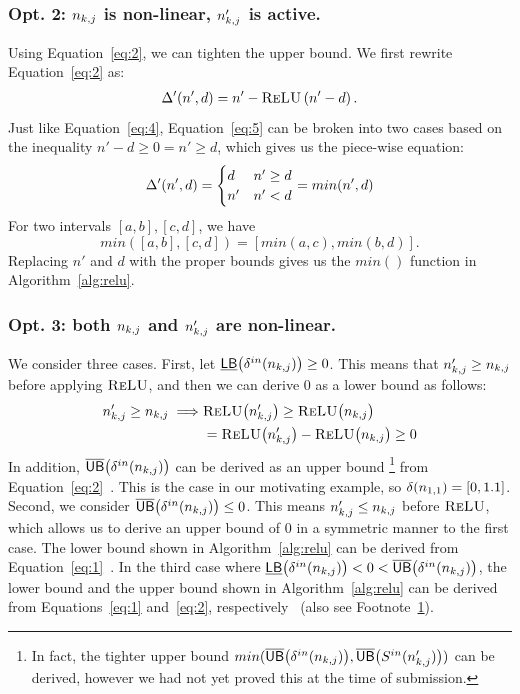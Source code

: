 \subsubsection{Opt. 2: $ n_{k,j} $ is non-linear, $ n'_{k,j} $ is active.}
Using Equation~\ref{eq:2}, we can tighten the upper bound.
We first rewrite Equation~\ref{eq:2} as:
\begin{align}
\Delta'(n', d) = n' - \textsc{ReLU}\left(n' - d\right). \label{eq:5}
\end{align}
Just like Equation~\ref{eq:4}, Equation~\ref{eq:5} can be broken into
two cases based on the inequality $ n' - d \geq 0 = n' \geq d $, which
gives us the piece-wise equation:
\[
\Delta'(n', d) = \begin{cases}
d & n' \geq d\\
n' & n' < d
\end{cases} = min(n', d)
\]
For two intervals $[a,b],[c,d]$, we have
\[
min([a,b],[c,d]) = [min(a, c), min(b, d)].
\]
Replacing $ n' $ and $ d $ with the proper bounds gives us the
$ min() $ function in Algorithm~\ref{alg:relu}.


\subsubsection{Opt. 3: both $ n_{k,j} $ and $ n'_{k,j} $ are non-linear.}
We consider three cases.
First, let $ \underline{\mathsf{LB}}\big(\delta^{in}(n_{k,j})\big) \geq 0 $.
This means that $ n'_{k,j} \geq n_{k,j} $ before applying $ \textsc{ReLU} $, and
then we can derive 0 as a lower bound as follows:
\begin{align*}
n'_{k,j} \geq n_{k,j} \implies & \textsc{ReLU}\big(n'_{k,j}\big) \geq \textsc{ReLU}\big(n_{k,j}\big) \\
&= \textsc{ReLU}\big(n'_{k,j}\big) - \textsc{ReLU}\big(n_{k,j}\big) \geq 0
\end{align*}
In addition, $ \overline{\mathsf{UB}}\big(\delta^{in}(n_{k,j})\big) $
can be derived as an upper bound
\footnote{
	In fact, the tighter upper bound $ min(\overline{\mathsf{UB}}\big(\delta^{in}(n_{k,j})\big), \overline{\mathsf{UB}}\big(S^{in}(n'_{k,j})\big)) $ can
	be derived, however we had not yet proved this at the time of submission.\label{fn:1}}
from Equation~\ref{eq:2}~\cite{arxivPaper}.
This is the case in our motivating
example, so $ \delta(n_{1,1}) = [0, 1.1] $. Second, we consider
$ \overline{\mathsf{UB}}\big(\delta^{in}(n_{k,j})\big) \leq 0 $. This means $n'_{k,j} \leq n_{k,j}$ before $ \textsc{ReLU} $, which allows
us to derive an upper bound of 0 in a symmetric manner to the first case. The lower bound shown in Algorithm~\ref{alg:relu}
can be derived from Equation~\ref{eq:1}~\cite{arxivPaper}. In the third case where
$ \underline{\mathsf{LB}}\big(\delta^{in}(n_{k,j})\big) < 0 < \overline{\mathsf{UB}}\big(\delta^{in}(n_{k,j})\big) $, the lower bound
and the upper bound shown in Algorithm~\ref{alg:relu} can be derived from Equations~\ref{eq:1} and~\ref{eq:2}, respectively~\cite{arxivPaper} (also see Footnote~\ref{fn:1}).


